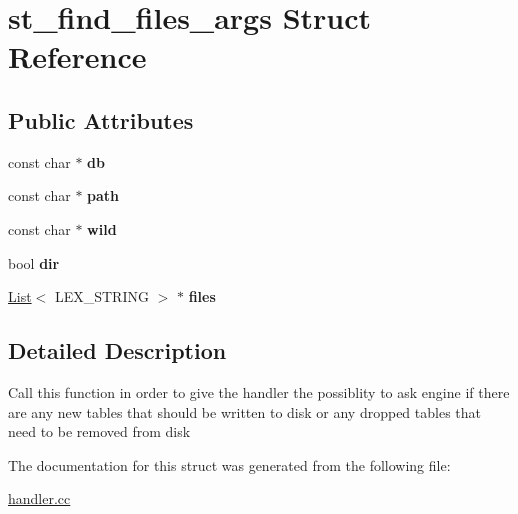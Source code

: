 \hypertarget{structst__find__files__args}{}\section{st\+\_\+find\+\_\+files\+\_\+args Struct Reference}
\label{structst__find__files__args}
\subsection*{Public Attributes}
\begin{DoxyCompactItemize}
\item 
\mbox{\label{structst__find__files__args_a662d807152a5b6ee314fc012eb96e249}} 
const char $\ast$ {\bfseries db}
\item 
\mbox{\label{structst__find__files__args_ab25184455fa68131f1c9b6c6906e42cb}} 
const char $\ast$ {\bfseries path}
\item 
\mbox{\label{structst__find__files__args_a61741e5c017a534609f4ac27b1e67704}} 
const char $\ast$ {\bfseries wild}
\item 
\mbox{\label{structst__find__files__args_a2f64be6a63f405db2fef44c855f0a325}} 
bool {\bfseries dir}
\item 
\mbox{\label{structst__find__files__args_a8e2088fb9efedb39391e4a44e7200477}} 
\mbox{\hyperlink{classList}{List}}$<$ L\+E\+X\+\_\+\+S\+T\+R\+I\+NG $>$ $\ast$ {\bfseries files}
\end{DoxyCompactItemize}


\subsection{Detailed Description}
Call this function in order to give the handler the possiblity to ask engine if there are any new tables that should be written to disk or any dropped tables that need to be removed from disk 

The documentation for this struct was generated from the following file\+:\begin{DoxyCompactItemize}
\item 
\mbox{\hyperlink{handler_8cc}{handler.\+cc}}\end{DoxyCompactItemize}
